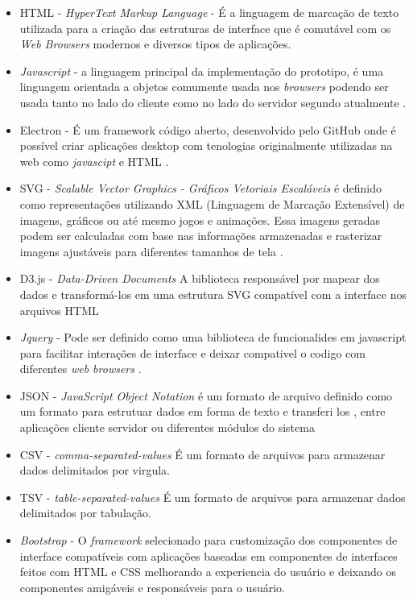 \documentclass[
	12pt,				%
	openright,			%
	oneside,			%
	a4paper,			%
	english,			%
	brazil				%
	]{abntex2}
\begin{document}
\begin{itemize}
    \item HTML - \textit{HyperText Markup Language} - É a linguagem de marcação de texto utilizada para a criação das estruturas de interface que é comutável com os \textit{Web Browsers} modernos e diversos tipos de aplicações.
    
    \item  \textit{Javascript} - a linguagem principal da implementação do prototipo, é uma linguagem orientada a objetos comumente usada nos \textit{browsers} podendo ser usada tanto no lado do cliente como no lado do servidor segundo atualmente \cite{javacript}.
    
    \item Electron - É um framework código aberto, desenvolvido pelo GitHub onde é possível criar aplicações desktop com tenologias originalmente utilizadas na web como \textit{javascipt} e HTML \cite{electron}.
    
    \item SVG - \textit{Scalable Vector Graphics - Gráficos Vetoriais Escaláveis} é definido como representações utilizando XML (Linguagem de Marcação Extensível) de imagens, gráficos ou até mesmo jogos e animações. Essa imagens geradas podem ser calculadas com base nas informações armazenadas e rasterizar imagens ajustáveis para diferentes tamanhos de tela \cite{peng2000scalable}.
    
    \item D3.js - \textit{Data-Driven Documents} A biblioteca responsável por mapear dos dados e transformá-los em uma estrutura SVG compatível com a interface nos arquivos HTML \cite{bostock2011d3}
    
    \item  \textit{Jquery}  - Pode ser definido como uma biblioteca de funcionalides em javascript para facilitar interações de interface e deixar compativel o codigo com diferentes \textit{web browsers} \cite{jquery}.

    \item JSON - \textit{JavaScript Object Notation} é um formato de arquivo definido como um formato para estrutuar dados em forma de texto e transferi los , entre aplicações cliente servidor ou diferentes módulos do sistema \cite{json}
    
    \item CSV -  \textit{comma-separated-values} É um formato de arquivos para armazenar dados delimitados por virgula.
    
    \item TSV -  \textit{table-separated-values} É um formato de arquivos para armazenar dados delimitados por tabulação.
    
    \item \textit{Bootstrap} -  O \textit{framework} \cite{bootsrap} selecionado para customização dos componentes de interface compatíveis com aplicações baseadas em componentes de interfaces feitos com HTML e CSS melhorando a experiencia do usuário e deixando os componentes amigáveis e responsáveis para o usuário. 
\end{itemize}
\end{document}
